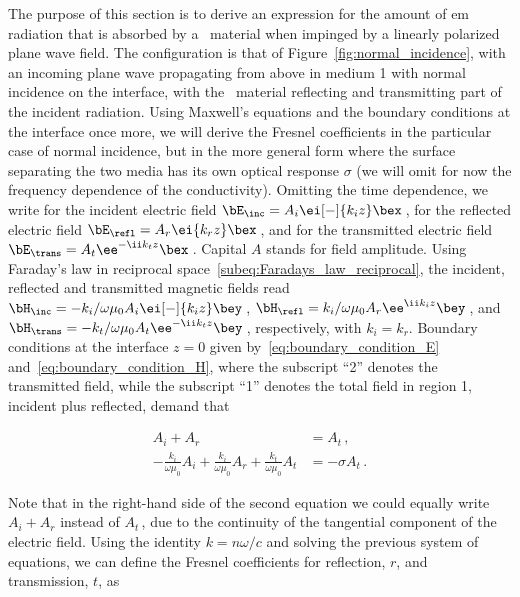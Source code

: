 The purpose of this section is to derive an expression for the amount of \gls{em} radiation that is absorbed by a \bd~material when impinged by a linearly polarized plane wave field.
The configuration is that of Figure~\ref{fig:normal_incidence}, with an incoming plane wave propagating from above in medium 1 with normal incidence on the interface, with the \bd~material reflecting and transmitting part of the incident radiation.
Using Maxwell's equations and the boundary conditions at the interface once more, we will derive the Fresnel coefficients in the particular case of normal incidence, but in the more general form where the surface separating the two media has its own optical response $\sigma$ (we will omit for now the frequency dependence of the conductivity).
Omitting the time dependence, we write for the incident electric field $\bE_\inc = A_i \ei[-]{k_i z} \bex$\,, for the reflected electric field $\bE_\refl = A_r \ei{k_r z}  \bex$\,, and for the transmitted electric field $\bE_\trans = A_t \ee^{-\ii k_t z}  \bex$\,.
Capital $A$ stands for field amplitude.
Using Faraday's law in reciprocal space~\eqref{subeq:Faradays_law_reciprocal}, the incident, reflected and transmitted magnetic fields read $\bH_\inc = - k_i/\omega \mu_0 A_i \ei[-]{k_i z} \bey$\,, $\bH_\refl = k_i/\omega \mu_0 A_r \ee^{\ii k_i z} \bey$\,, and $\bH_\trans = - k_t/\omega \mu_0 A_t \ee^{-\ii k_t z} \bey$\,, respectively, with $k_i=k_r$.
Boundary conditions at the interface $z=0$ given by~\eqref{eq:boundary_condition_E} and~\eqref{eq:boundary_condition_H}, where the subscript ``2'' denotes the transmitted field, while the subscript ``1'' denotes the total field in region 1, incident plus reflected, demand that

\begin{subequations}
    \begin{align}
        A_i + A_r &= A_t\,, \label{subeq:boundary_condition_E_incidence}\\
        -\frac{k_i}{\omega \mu_0} A_i + \frac{k_i}{\omega \mu_0} A_r + \frac{k_t}{\omega \mu_0} A_t &= - \sigma A_t \label{subeq:boundary_condition_H_incidence}\,.
    \end{align}
\end{subequations}

\noindent Note that in the right-hand side of the second equation we could equally write $A_i + A_r$ instead of $A_t$\,, due to the continuity of the tangential component of the electric field.
Using the identity $k = n \omega / c $ and solving the previous system of equations, we can define the Fresnel coefficients for reflection, $r$, and transmission, $t$, as

